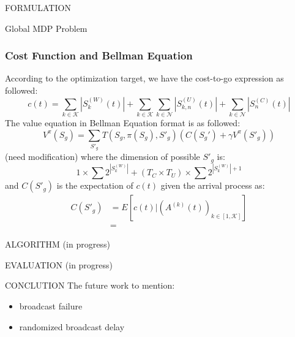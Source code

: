 \documentclass[10pt, conference, letterpaper]{IEEEtran}
\begin{document}
\begin{section}{FORMULATION}
\begin{subsection}{Global MDP Problem\*}
            \subsubsection*{Cost Function and Bellman Equation}
                According to the optimization target, we have the cost-to-go expression as followed:
                $$
                c(t) = \sum_{k \in \mathcal{K}}{|S^{(W)}_{k}(t)|}
                        + \sum_{k \in \mathcal{K}}\sum_{k \in \mathcal{N}}{|S^{(U)}_{k,n}(t)|}
                        + \sum_{k \in \mathcal{N}}{|S^{(C)}_{n}(t)|}
                $$
                The value equation in Bellman Equation format is as followed:
                $$
                V^{\pi}(S_g) = \sum_{S'_g} T(S_g, \pi(S_g), S'_g) (C(S_g') + \gamma V^{\pi}(S'_g))
                $$
                (need modification) where the dimension of possible $S'_g$ is:
                $$
                1 \times \sum{2^{|S^{(W)}_k|}} + (T_C \times T_U) \times \sum{2^{|S^{(W)}_k|+1}}
                $$
                and $C(S'_g)$ is the expectation of $c(t)$ given the arrival process as:
                \begin{align*}
                    C(S'_g) &= E[c(t)|(A^{(k)}(t))_{k \in [1,\mathcal{K}]}]
                    \\
                    &= 
                \end{align*}
        \end{subsection}
        
    \end{section}

    \begin{section}{ALGORITHM}
        \label{sec:algorithm}
        (in progress)
    \end{section}

    \begin{section}{EVALUATION}
        \label{sec:evaluation}
        (in progress)
    \end{section}

    \begin{section}{CONCLUTION}
        \label{sec:conclusion}
        The future work to mention:
        \begin{itemize}
            \item broadcast failure
            \item randomized broadcast delay
        \end{itemize}
    \end{section}

    
    
\end{document}
